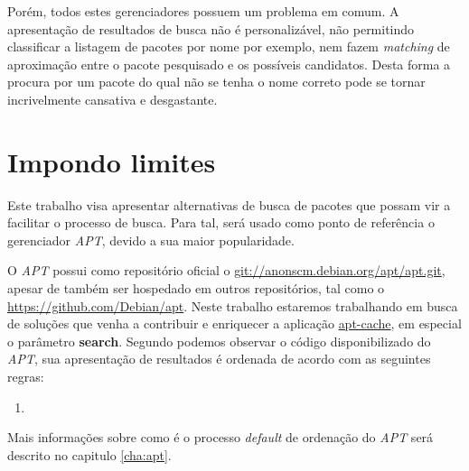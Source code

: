 Porém, todos estes gerenciadores possuem um problema em comum. A apresentação de resultados de busca não é personalizável, não permitindo classificar a listagem de pacotes por nome por exemplo, nem fazem \textit{matching} de aproximação  entre o pacote pesquisado e os possíveis candidatos. Desta forma a procura por um pacote do qual não se tenha o nome correto pode se tornar incrivelmente cansativa e desgastante.

\section{Impondo limites} %
\label{sub:impondo_limites}


Este trabalho visa apresentar alternativas de busca de pacotes que possam vir a facilitar  o processo de busca. Para tal, será usado como ponto de referência o gerenciador \textit{APT}, devido a sua maior popularidade.

O \textit{APT} possui como repositório oficial o \url{git://anonscm.debian.org/apt/apt.git}, apesar de também ser hospedado em outros repositórios, tal como o \url{https://github.com/Debian/apt}. Neste trabalho estaremos trabalhando em busca de soluções que venha a contribuir e enriquecer a aplicação \href{https://github.com/Debian/apt/blob/debian/experimental/cmdline/apt-cache.cc}{apt-cache}, em especial o parâmetro \textbf{search}. Segundo podemos observar o código disponibilizado do \textit{APT}, sua apresentação de resultados é ordenada de acordo com as seguintes regras:

\begin{enumerate}
	\item 
\end{enumerate}

Mais informações sobre como é o processo \textit{default} de ordenação do \textit{APT} será descrito no capitulo \ref{cha:apt}.
